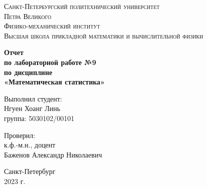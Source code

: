 \begin{titlepage}
	\begin{center}
		\textsc{Санкт-Петербургский политехнический университет\\Петра Великого\\[5mm]
			Физико-механический институт\\[2mm]
			Высшая школа прикладной математики и вычислительной физики}
		
		\vfill
		
		\textbf{Отчет\\по лабораторной работе №9\\по дисциплине\\ «Математическая статистика»
			\\[26mm]
		}
	\end{center}
	
	\begin{flushright}
		Выполнил студент: \\
		Нгуен Хоанг Линь \\
		группа: 5030102/00101 \\
	\end{flushright}
	
	\begin{flushright}
		Проверил: \\
		к.ф.-м.н., доцент \\
		Баженов Александр Николаевич
	\end{flushright}
	
	\vspace*{\fill}
	\begin{center}
		Санкт-Петербург\\2023 г.
	\end{center}
\end{titlepage}